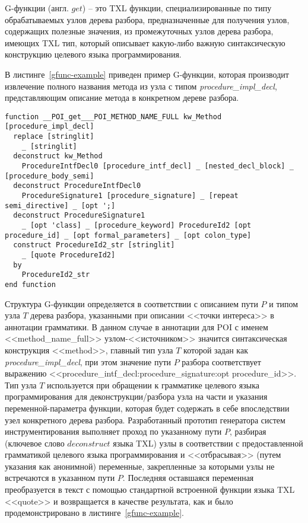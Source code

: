 G-функции (англ. $get$) -- это TXL функции, специализированные по типу обрабатываемых узлов дерева разбора, предназначенные для получения узлов, содержащих полезные значения, из промежуточных узлов дерева разбора, имеющих TXL тип, который описывает какую-либо важную синтаксическую конструкцию целевого языка программирования.

В листинге~\ref{gfunc-example} приведен пример G-функции, которая производит извлечение полного названия метода из узла с типом \textit{procedure\_impl\_decl}, представляющим описание метода в конкретном дереве разбора.

\begin{lstlisting}[frame=single, language=TXL, label={gfunc-example}, caption={Пример синтезированной G-функции.}]
function __POI_get___POI_METHOD_NAME_FULL kw_Method [procedure_impl_decl]
  replace [stringlit]
    _ [stringlit]
  deconstruct kw_Method
    ProcedureIntfDecl0 [procedure_intf_decl] _ [nested_decl_block] _ [procedure_body_semi]
  deconstruct ProcedureIntfDecl0
    ProcedureSignature1 [procedure_signature] _ [repeat semi_directive] _ [opt ';]
  deconstruct ProcedureSignature1
    _ [opt 'class] _ [procedure_keyword] ProcedureId2 [opt procedure_id] _ [opt formal_parameters] _ [opt colon_type]
  construct ProcedureId2_str [stringlit]
    _ [quote ProcedureId2]
  by
    ProcedureId2_str
end function
\end{lstlisting}

Структура G-функции определяется в соответствии с описанием пути $P$ и типом узла $T$ дерева разбора, указанными при описании <<точки интереса>> в аннотации грамматики.
В данном случае в аннотации для POI с именем <<method\_name\_full>> узлом-<<источником>> значится синтаксическая конструкция <<method>>, главный тип узла $T$ которой задан как \textit{procedure\_impl\_decl}, при этом значение пути $P$ разбора соответствует выражению <<procedure\_intf\_decl:procedure\_signature:opt procedure\_id>>.
Тип узла $T$ используется при обращении к грамматике целевого языка программирования для деконструкции/разбора узла на части и указания переменной-параметра функции, которая будет содержать в себе впоследствии узел конкретного дерева разбора.
Разработанный прототип генератора систем инструментирования выполняет проход по указанному пути $P$, разбирая (ключевое слово $deconstruct$ языка TXL) узлы в соответствии с предоставленной грамматикой целевого языка программирования и <<отбрасывая>> (путем указания как анонимной) переменные, закрепленные за которыми узлы не встречаются в указанном пути $P$.
Последняя оставшаяся переменная преобразуется в текст с помощью стандартной встроенной функции языка TXL <<quote>> и возвращается в качестве результата, как и было продемонстрировано в листинге~\ref{gfunc-example}.

